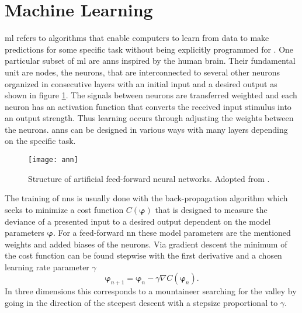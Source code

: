 \section{Machine Learning}
\ac{ml} refers to algorithms that enable computers to learn from data to make predictions for some specific task without being explicitly programmed for \citep{kubat2021introduction}. One particular subset of \ac{ml} are \acp{ann} inspired by the human brain. Their fundamental unit are nodes, the neurons, that are interconnected to several other neurons organized in consecutive layers with an initial input and a desired output as shown in figure \ref{fig:ann}. The signals between neurons are transferred weighted and each neuron has an activation function that converts the received input stimulus into an output strength. Thus learning occurs through adjusting the weights between the neurons. \acp{ann} can be designed in various ways with many layers depending on the specific task.
\begin{figure}
    \centering
    \texttt{[image: ann]}
    \caption[]{Structure of artificial feed-forward neural networks. Adopted from \citep{8114708}.}
    \label{fig:ann}
\end{figure}

The training of \acp{nn} is usually done with the back-propagation algorithm which seeks to minimize a cost function $C(\bm{\varphi})$ that is designed to measure the deviance of a presented input to a desired output dependent on the model parameters $\bm{\varphi}$. For a feed-forward \ac{nn} these model parameters are the mentioned weights and added biases of the neurons. Via gradient descent the minimum of the cost function can be found stepwise with the first derivative and a chosen learning rate parameter $\gamma$
\begin{equation}
    \bm{\varphi}_{n+1} = \bm{\varphi}_n-\gamma\nabla C(\bm{\varphi}_n).
    \label{eq:grad_descent}
\end{equation}
In three dimensions this corresponds to a mountaineer searching for the valley by going in the direction of the steepest descent with a stepsize proportional to $\gamma$.



